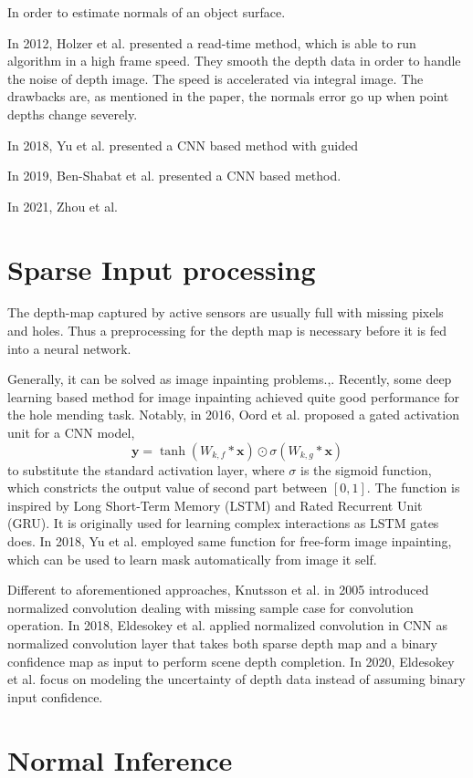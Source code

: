 

In order to estimate normals of an object surface.

In 2012, Holzer et al. \cite{Holzer.S} presented a read-time method, which is able to run algorithm in a high frame speed. They smooth the depth data in order to handle the noise of depth image. The speed is accelerated via integral image. The drawbacks are, as mentioned in the paper, the normals error go up when point depths change severely.

In 2018, Yu et al. \cite{gconv} presented a CNN based method with guided 

In 2019, Ben-Shabat et al. \cite{Ben-Shabat_2019_CVPR} presented a CNN based method.


In 2021, Zhou et al.  \cite{zhou2021fast}


\section{Sparse Input processing}
The depth-map captured by active sensors are usually full with missing pixels and holes. Thus a preprocessing for the depth map is necessary before it is fed into a neural network.

Generally, it can be solved as image inpainting problems.\cite{inpainting1},\cite{inpainting2}. Recently, some deep learning based method for image inpainting achieved quite good performance for the hole mending task. 
Notably, in 2016, Oord et al. \cite{gated_activation} proposed a gated activation unit for a CNN model,
\[\textbf{y} = \tanh (W_{k,f} * \textbf{x}) \odot \sigma (W_{k,g} * \textbf{x})\]
to substitute the standard activation layer, where $ \sigma $ is the sigmoid function, which constricts the output value of second part between $ [0,1] $.  The function is inspired by Long Short-Term Memory (LSTM) \cite{lstm} and Rated Recurrent Unit (GRU).\cite{gru} It is originally used for learning complex interactions as LSTM gates does. In 2018, Yu et al. \cite{gconv} employed same function for free-form image inpainting, which can be used to learn mask automatically from image it self.

Different to aforementioned approaches, Knutsson et al. in 2005 introduced normalized convolution \cite{nconv} dealing with missing sample case for convolution operation. 
In 2018, Eldesokey et al. \cite{ncnn} applied normalized convolution in CNN as normalized convolution layer that takes both sparse depth map and a binary confidence map as input to perform scene depth completion.  
In 2020, Eldesokey et al. \cite{pncnn} focus on modeling the uncertainty of depth data instead of assuming binary input confidence.

\section{Normal Inference}
